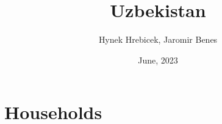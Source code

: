 \documentclass[14pt]{beamer}
\title{Uzbekistan}
\institute{DSGE model for an open economy}
\author{Hynek Hrebicek, Jaromir Benes}
\date{June, 2023}
\begin{document}
\maketitle


%
\section{Households}
  

\end{document}
